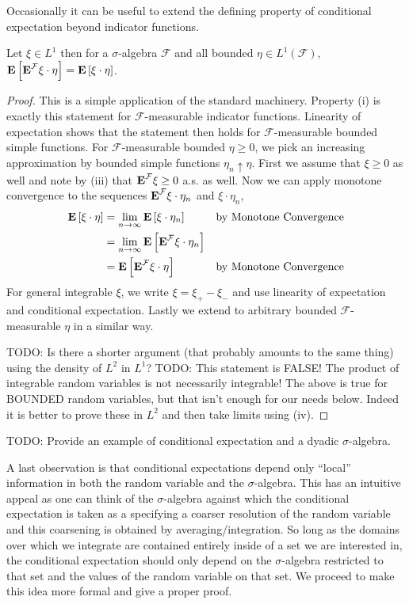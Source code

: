 Occasionally it can be useful to extend the defining property of
conditional expectation beyond indicator functions.
\begin{lem}Let $\xi \in L^1$ then for a $\sigma$-algebra $\mathcal{F}$
  and all bounded $\eta \in L^1(\mathcal{F})$,
  $\textbf{E}\left[\textbf{E}^{\mathcal{F}} \xi\cdot\eta\right] = \textbf{E}\left[\xi\cdot\eta\right] $.
\end{lem}
\begin{proof}
This is a simple application of the standard machinery.
Property (i) is exactly this statement for $\mathcal{F}$-measurable indicator functions.
Linearity of expectation shows that the statement then holds for
$\mathcal{F}$-measurable bounded simple functions.  For
$\mathcal{F}$-measurable bounded $\eta \geq 0$, we pick an increasing
approximation by bounded simple functions $\eta_n \uparrow \eta$.  First we
assume that $\xi \geq 0$ as well and note by (iii) that
$\textbf{E}^{\mathcal{F}} \xi \geq 0$ a.s. as well.  Now we can
apply monotone convergence to the sequences
$\textbf{E}^{\mathcal{F}} \xi \cdot \eta_n$ and $\xi \cdot \eta_n$,
\begin{align*}
\textbf{E}\left[\xi \cdot \eta\right] &= \lim_{n \to \infty} \textbf{E}\left[\xi
  \cdot \eta_n\right] & & \text{by Monotone Convergence} \\
&=\lim_{n \to \infty} \textbf{E}\left[\textbf{E}^{\mathcal{F}} \xi 
  \cdot \eta_n\right] \\
&=\textbf{E}\left[\textbf{E}^{\mathcal{F}} \xi 
  \cdot \eta\right] & & \text{by Monotone Convergence} \\
\end{align*}
For general integrable $\xi$, we write $\xi = \xi_+ - \xi_-$ and use
linearity of expectation and conditional expectation.  Lastly we
extend to arbitrary bounded $\mathcal{F}$-measurable $\eta$ in a similar
way.  


TODO: Is there a shorter argument (that probably amounts to the
same thing) using the density of $L^2$ in $L^1$?  TODO:  This
statement is FALSE!  The product of integrable random variables is not
necessarily integrable!  The above is true for BOUNDED random
variables, but that isn't enough for our needs below.  Indeed it is
better to prove these in $L^2$ and then take limits using (iv).
\end{proof}

TODO: Provide an example of conditional expectation and a dyadic
$\sigma$-algebra.

A last observation is that conditional expectations depend only 
``local'' information in both the random variable and the
$\sigma$-algebra.  This has an intuitive appeal as one can think of
the $\sigma$-algebra against which the conditional expectation is
taken as a specifying a coarser resolution of the random variable and
this coarsening is obtained by averaging/integration.  So long as the
domains over which we integrate are contained entirely inside of a
set we are interested in, the conditional expectation should only
depend on the $\sigma$-algebra restricted to that set and the values
of the random variable on that set.  We proceed to make this idea more
formal and give a proper proof.


